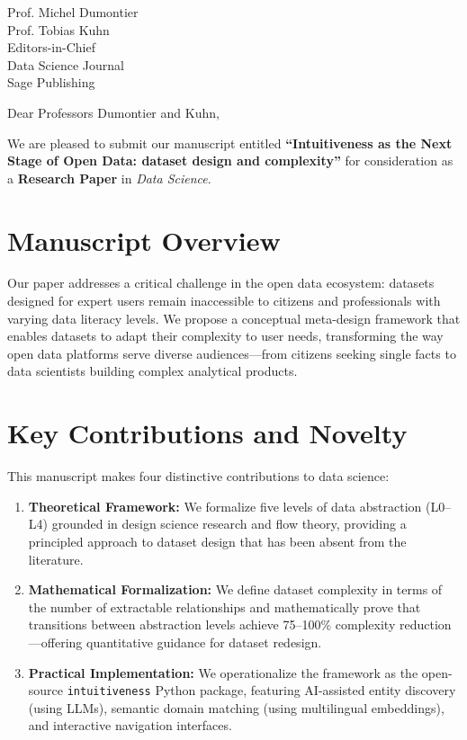 \documentclass[11pt,a4paper]{letter}
\date{\today}
\begin{document}
\begin{letter}{%
Prof. Michel Dumontier\\
Prof. Tobias Kuhn\\
Editors-in-Chief\\
Data Science Journal\\
Sage Publishing
}

\opening{Dear Professors Dumontier and Kuhn,}

We are pleased to submit our manuscript entitled \textbf{``Intuitiveness as the Next Stage of Open Data: dataset design and complexity''} for consideration as a \textbf{Research Paper} in \textit{Data Science}.

\section*{Manuscript Overview}

Our paper addresses a critical challenge in the open data ecosystem: datasets designed for expert users remain inaccessible to citizens and professionals with varying data literacy levels. We propose a conceptual meta-design framework that enables datasets to adapt their complexity to user needs, transforming the way open data platforms serve diverse audiences---from citizens seeking single facts to data scientists building complex analytical products.

\section*{Key Contributions and Novelty}

This manuscript makes four distinctive contributions to data science:

\begin{enumerate}
    \item \textbf{Theoretical Framework:} We formalize five levels of data abstraction (L0--L4) grounded in design science research and flow theory, providing a principled approach to dataset design that has been absent from the literature.

    \item \textbf{Mathematical Formalization:} We define dataset complexity in terms of the number of extractable relationships and mathematically prove that transitions between abstraction levels achieve 75--100\% complexity reduction---offering quantitative guidance for dataset redesign.

    \item \textbf{Practical Implementation:} We operationalize the framework as the open-source \texttt{intuitiveness} Python package, featuring AI-assisted entity discovery (using LLMs), semantic domain matching (using multilingual embeddings), and interactive navigation interfaces.


\end{enumerate}
\end{letter}
\end{document}

